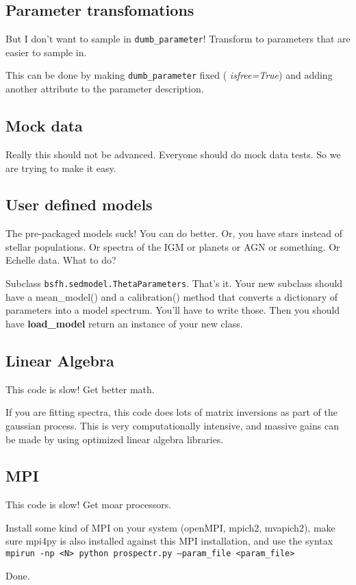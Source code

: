 \subsection{Parameter transfomations}
But I don't want to sample in \texttt{dumb_parameter}!  Transform to
parameters that are easier to sample in.

This can be done by making \texttt{dumb_parameter} fixed ({\it
isfree=True}) and adding another attribute to the parameter
description.

\subsection{Mock data}
Really this should not be advanced.  Everyone should do mock data
tests.  So we are trying to make it easy.

\subsection{User defined models}
The pre-packaged models suck!  You can do better.  Or, you have stars
instead of stellar populations.  Or spectra of the IGM or planets or
AGN or something. Or Echelle data. What to do?

Subclass \texttt{bsfh.sedmodel.ThetaParameters}.  That's it.  Your new
subclass should have a mean_model() and a calibration() method that
converts a dictionary of parameters into a model spectrum.  You'll
have to write those.  Then you should have {\bf load_model} return an
instance of your new class.

\subsection{Linear Algebra}
This code is slow!  Get better math.

If you are fitting spectra, this code does lots of matrix inversions
as part of the gaussian process.  This is very computationally
intensive, and massive gains can be made by using optimized linear
algebra libraries.

\subsection{MPI}
This code is slow!  Get moar processors.

Install some kind of MPI on your system (openMPI, mpich2, mvapich2),
make sure mpi4py is also installed against this MPI installation, and
use the syntax \texttt{mpirun -np <N> python prospectr.py --param_file
<param_file>}

Done.



